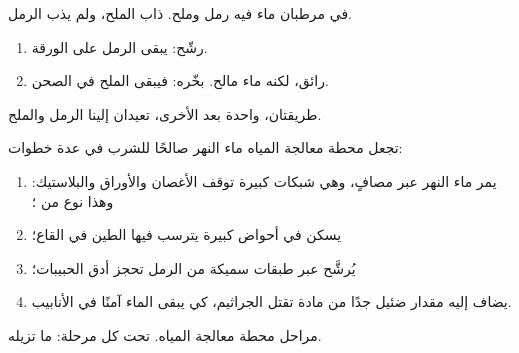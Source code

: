 \begin{example}\label{ex:g3:separating-mixtures:three}
في مرطبان ماء فيه رمل وملح. ذاب الملح، ولم يذب
الرمل.
\begin{enumerate}
  \item رشّح: يبقى الرمل على الورقة.
  \item {} رائق، لكنه ماء مالح. بخّره: فيبقى
        الملح في الصحن.
\end{enumerate}
طريقتان، واحدة بعد الأخرى، تعيدان إلينا الرمل والملح.
\end{example}

\begin{example}\label{ex:g3:separating-mixtures:plant}
تجعل محطة معالجة المياه ماء النهر صالحًا للشرب في عدة خطوات:
\begin{enumerate}
  \item يمر ماء النهر عبر مصافٍ، وهي شبكات كبيرة توقف
        الأغصان والأوراق والبلاستيك: وهذا نوع من ؛
  \item يسكن في أحواض كبيرة يترسب فيها الطين في القاع؛
  \item يُرشَّح عبر طبقات سميكة من الرمل تحجز أدق
        الحبيبات؛
  \item يضاف إليه مقدار ضئيل جدًا من مادة تقتل الجراثيم، كي
        يبقى الماء آمنًا في الأنابيب.
\end{enumerate}
\end{example}

\begin{omfigure}

{\small مراحل محطة معالجة المياه. تحت كل مرحلة: ما
تزيله.}
\end{omfigure}

